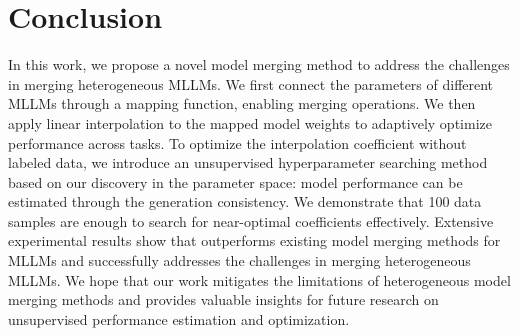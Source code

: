 \section{Conclusion}
\label{sec:conclusion}

In this work, we propose a novel model merging method \ours to address the challenges in merging heterogeneous MLLMs. We first connect the parameters of different MLLMs through a mapping function, enabling merging operations. We then apply linear interpolation to the mapped model weights to adaptively optimize performance across tasks. To optimize the interpolation coefficient without labeled data, we introduce an unsupervised hyperparameter searching method based on our discovery in the parameter space: model performance can be estimated through the generation consistency. We demonstrate that 100 data samples are enough to search for near-optimal coefficients effectively.
Extensive experimental results show that \ours outperforms existing model merging methods for MLLMs and successfully addresses the challenges in merging heterogeneous MLLMs. We hope that our work mitigates the limitations of heterogeneous model merging methods and provides valuable insights for future research on unsupervised performance estimation and optimization.

